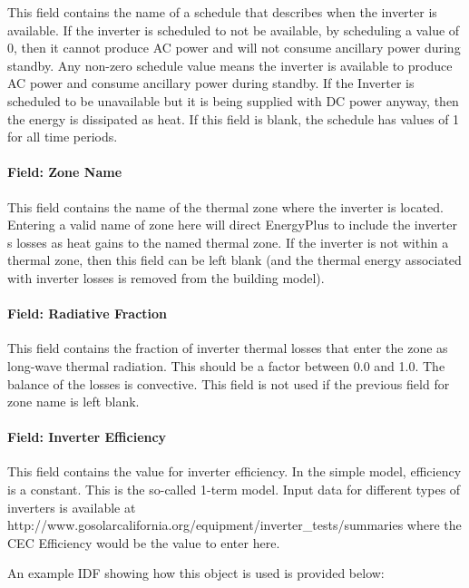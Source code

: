 This field contains the name of a schedule that describes when the inverter is available. If the inverter is scheduled to not be available, by scheduling a value of 0, then it cannot produce AC power and will not consume ancillary power during standby. Any non-zero schedule value means the inverter is available to produce AC power and consume ancillary power during standby. If the Inverter is scheduled to be unavailable but it is being supplied with DC power anyway, then the energy is dissipated as heat. If this field is blank, the schedule has values of 1 for all time periods.

\paragraph{Field: Zone Name}\label{field-zone-name-1-003}

This field contains the name of the thermal zone where the inverter is located. Entering a valid name of zone here will direct EnergyPlus to include the inverter s losses as heat gains to the named thermal zone. If the inverter is not within a thermal zone, then this field can be left blank (and the thermal energy associated with inverter losses is removed from the building model).

\paragraph{Field: Radiative Fraction}\label{field-radiative-fraction-1}

This field contains the fraction of inverter thermal losses that enter the zone as long-wave thermal radiation. This should be a factor between 0.0 and 1.0. The balance of the losses is convective. This field is not used if the previous field for zone name is left blank.

\paragraph{Field: Inverter Efficiency}\label{field-inverter-efficiency}

This field contains the value for inverter efficiency. In the simple model, efficiency is a constant. This is the so-called 1-term model. Input data for different types of inverters is available at http://www.gosolarcalifornia.org/equipment/inverter\_tests/summaries where the CEC Efficiency would be the value to enter here.

An example IDF showing how this object is used is provided below:

